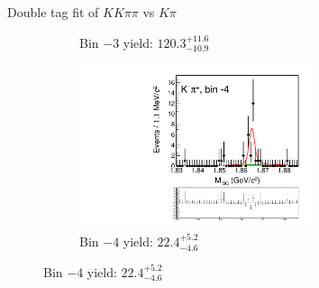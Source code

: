 \documentclass{beamer}
\begin{document}
\begin{frame}{Double tag fit of $KK\pi\pi$ vs $K\pi$}
\begin{figure}
\begin{subfigure}{0.5\textwidth}
      \caption{Bin $-3$ yield: $120.3_{-10.9}^{+11.6}$}
    \end{subfigure}%
    \begin{subfigure}{0.5\textwidth}
      \centering
      \includegraphics[width=0.75\textwidth,trim={0 5cm 0 0},clip=true]{Plots/DoubleTagYield_DoubleTag_Flavour_KKpipi_vs_Kpi_SignalBinM4_TagBin0.pdf}
      \caption{Bin $-4$ yield: $22.4_{-4.6}^{+5.2}$}
    \end{subfigure}
  \end{figure}
\end{frame}
\end{document}
